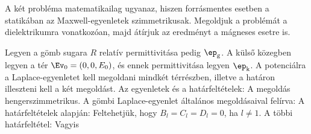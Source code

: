    A két probléma matematikailag ugyanaz, hiszen forrásmentes esetben a statikában az Maxwell-egyenletek szimmetrikusak.
   Megoldjuk a problémát a dielektrikumra vonatkozóan, majd átírjuk az eredményt a mágneses esetre is. 
   
   Legyen a gömb sugara $R$ relatív permittivitása pedig $\ep_\text{g}$.
   A külső közegben legyen a tér $\Ev_0=(0,0,E_0)$, és ennek permittivitása legyen $\ep_\text{k}$.
   A potenciálra a Laplace-egyenletet kell megoldani mindkét térrészben, illetve a határon illeszteni kell a két megoldást.
   Az egyenletek és a határfeltételek:
   A megoldás hengerszimmetrikus.
   A gömbi Laplace-egyenlet általános megoldásaival felírva:
   A határfeltételek alapján:
   Feltehetjük, hogy $B_l=C_l=D_l=0$, ha $l\ne 1$.
   A többi határfeltétel:
   Vagyis
   
